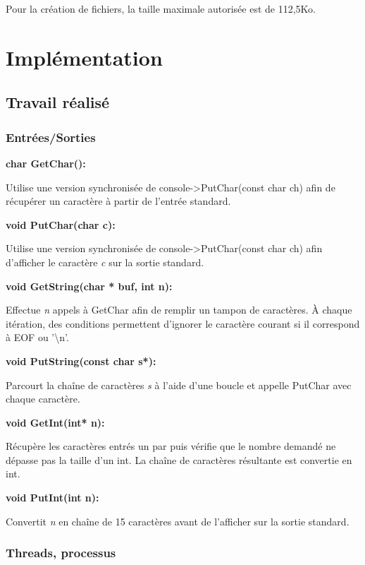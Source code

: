 \documentclass[12pt]{report}
\begin{document}
\bigskip
Pour la création de fichiers, la taille maximale autorisée est de 112,5Ko.


\chapter{Implémentation}

\section{Travail réalisé}
\bigskip

\subsection{Entrées/Sorties}

\textbf{char GetChar():} 

Utilise une version synchronisée de console->PutChar(const char ch)
afin de récupérer un caractère à partir de l'entrée standard.

\bigskip

\textbf{void PutChar(char c):} 

Utilise une version synchronisée de console->PutChar(const char ch)
afin d'afficher le caractère \textit{c} sur la sortie standard.
\bigskip


\textbf{void GetString(char * buf, int n):} 

Effectue \textit{n} appels à GetChar afin de remplir un tampon de caractères.
À chaque itération, des conditions permettent d'ignorer le caractère courant si
il correspond à EOF ou '\textbackslash n'.

\bigskip

\textbf{void PutString(const char s*):}

Parcourt la chaîne de caractères \textit{s} à l'aide d'une boucle et appelle PutChar avec chaque caractère.
\bigskip	
	

\textbf{void GetInt(int* n):}	
	
Récupère les caractères entrés un par puis vérifie que le nombre demandé ne dépasse pas la taille d'un int.
La chaîne de caractères résultante est convertie en int.
\bigskip

\textbf{void PutInt(int n):}

Convertit \textit{n} en chaîne de 15 caractères avant de l'afficher sur la sortie standard.
\newpage	


\subsection{Threads, processus}
\end{document}
